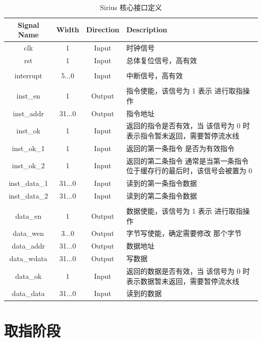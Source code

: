 \documentclass[blue,normal,cn,hide]{elegantbook}
\begin{document}
\begin{table}
    \renewcommand\arraystretch{1.25}
    \centering
    \begin{tabular}{cccm{}}
        \toprule 
        \rowcolor{black!20} \textbf{Signal Name} & \textbf{Width} & \textbf{Direction} & \textbf{Description} \\
        \midrule
        clk & 1 & Input & 时钟信号 \\
        rst & 1 & Input & 总体复位信号，高有效 \\
        \\
        interrupt & 5...0 & Input & 中断信号，高有效 \\
        \\
        inst\_en & 1 & Output & 指令使能，该信号为 1 表示
        进行取指操作 \\
        inst\_addr & 31...0 & Output & 指令地址 \\
        inst\_ok & 1 & Input & 返回的指令是否有效，当
        该信号为 0 时表示指令暂未返回，需要暂停流水线 \\
        inst\_ok\_1 & 1 & Input & 返回的第一条指令
        是否为有效指令 \\
        inst\_ok\_2 & 1 & Input & 返回的第二条指令
        通常是当第一条指令位于缓存行的最后时，该信号会被置为 0 \\
        inst\_data\_1 & 31...0 & Input & 读到的第一条指令数据 \\
        inst\_data\_2 & 31...0 & Input & 读到的第二条指令数据 \\
        \\
        data\_en & 1 & Output & 数据使能，该信号为 1 表示
        进行取指操作 \\
        data\_wen & 3...0 & Output & 字节写使能，确定需要修改
        那个字节 \\
        data\_addr & 31...0 & Output & 数据地址 \\
        data\_wdata & 31...0 & Output & 写数据 \\
        data\_ok & 1 & Input & 返回的数据是否有效，当
        该信号为 0 时表示数据暂未返回，需要暂停流水线 \\
        data\_data & 31...0 & Input & 读到的数据 \\
        \bottomrule
    \end{tabular}
    \caption{Sirius 核心接口定义}
    \label{tab:SiriusCoreInterface}
\end{table}

\section{取指阶段}
\end{document}
